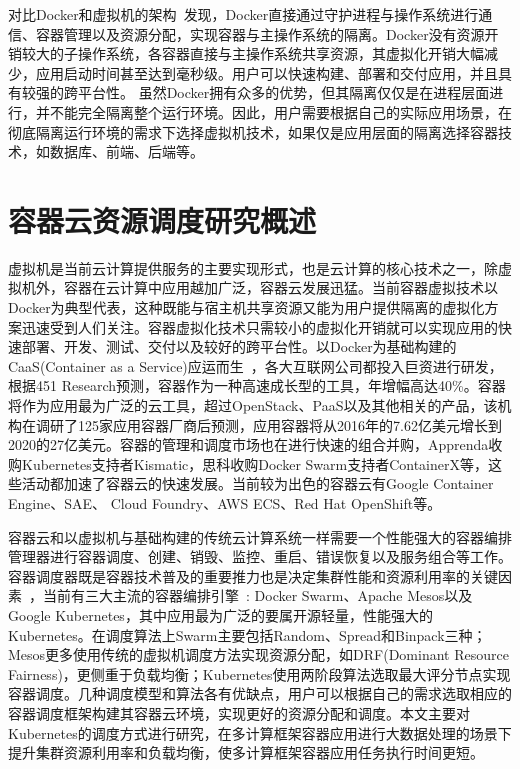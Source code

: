 对比Docker和虚拟机的架构~\cite{Barik2017Performance, Felter2007An}发现，Docker直接通过守护进程与操作系统进行通信、容器管理以及资源分配，实现容器与主操作系统的隔离。Docker没有资源开销较大的子操作系统，各容器直接与主操作系统共享资源，其虚拟化开销大幅减少，应用启动时间甚至达到毫秒级。用户可以快速构建、部署和交付应用，并且具有较强的跨平台性。
虽然Docker拥有众多的优势，但其隔离仅仅是在进程层面进行，并不能完全隔离整个运行环境。因此，用户需要根据自己的实际应用场景，在彻底隔离运行环境的需求下选择虚拟机技术，如果仅是应用层面的隔离选择容器技术，如数据库、前端、后端等。

\section{容器云资源调度研究概述}
虚拟机是当前云计算提供服务的主要实现形式，也是云计算的核心技术之一，除虚拟机外，容器在云计算中应用越加广泛，容器云发展迅猛。当前容器虚拟技术以Docker为典型代表，这种既能与宿主机共享资源又能为用户提供隔离的虚拟化方案迅速受到人们关注。容器虚拟化技术只需较小的虚拟化开销就可以实现应用的快速部署、开发、测试、交付以及较好的跨平台性。以Docker为基础构建的CaaS(Container as a Service)应运而生~\cite{Kozhirbayev2017A}，各大互联网公司都投入巨资进行研发，根据451 Research预测，容器作为一种高速成长型的工具，年增幅高达40\%。容器将作为应用最为广泛的云工具，超过OpenStack、PaaS以及其他相关的产品，该机构在调研了125家应用容器厂商后预测，应用容器将从2016年的7.62亿美元增长到2020的27亿美元。容器的管理和调度市场也在进行快速的组合并购，Apprenda收购Kubernetes支持者Kismatic，思科收购Docker Swarm支持者ContainerX等，这些活动都加速了容器云的快速发展。当前较为出色的容器云有Google Container Engine、SAE、 Cloud Foundry、AWS ECS、Red Hat OpenShift等。

容器云和以虚拟机与基础构建的传统云计算系统一样需要一个性能强大的容器编排管理器进行容器调度、创建、销毁、监控、重启、错误恢复以及服务组合等工作。容器调度器既是容器技术普及的重要推力也是决定集群性能和资源利用率的关键因素~\cite{Application2017}，当前有三大主流的容器编排引擎~\cite{Usman2016}: Docker Swarm、Apache Mesos以及Google Kubernetes，其中应用最为广泛的要属开源轻量，性能强大的Kubernetes。在调度算法上Swarm主要包括Random、Spread和Binpack三种；Mesos更多使用传统的虚拟机调度方法实现资源分配，如DRF(Dominant Resource Fairness)，更侧重于负载均衡；Kubernetes使用两阶段算法选取最大评分节点实现容器调度。几种调度模型和算法各有优缺点，用户可以根据自己的需求选取相应的容器调度框架构建其容器云环境，实现更好的资源分配和调度。本文主要对Kubernetes的调度方式进行研究，在多计算框架容器应用进行大数据处理的场景下提升集群资源利用率和负载均衡，使多计算框架容器应用任务执行时间更短。

